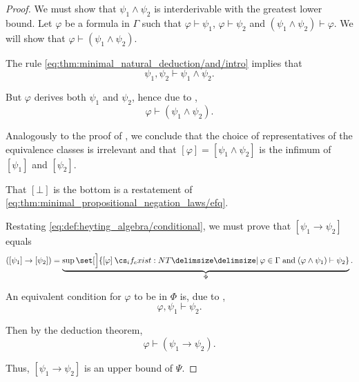 \begin{proof}
  We must show that \( \psi_1 \wedge \psi_2 \) is interderivable with the greatest lower bound. Let \( \varphi \) be a formula in \( \Gamma \) such that \( \varphi \vdash \psi_1 \), \( \varphi \vdash \psi_2 \) and \( (\psi_1 \wedge \psi_2) \vdash \varphi \). We will show that \( \varphi \vdash (\psi_1 \wedge \psi_2) \).

  The rule \eqref{eq:thm:minimal_natural_deduction/and/intro} implies that
  \begin{equation*}
    \psi_1, \psi_2 \vdash \psi_1 \wedge \psi_2.
  \end{equation*}

  But \( \varphi \) derives both \( \psi_1 \) and \( \psi_2 \), hence due to ,
  \begin{equation*}
    \varphi \vdash (\psi_1 \wedge \psi_2).
  \end{equation*}

  Analogously to the proof of , we conclude that the choice of representatives of the equivalence classes is irrelevant and that \( [\varphi] = [\psi_1 \wedge \psi_2] \) is the infimum of \( [\psi_1] \) and \( [\psi_2] \).

   That \( [\bot] \) is the bottom is a restatement of \eqref{eq:thm:minimal_propositional_negation_laws/efq}.

   Restating \eqref{eq:def:heyting_algebra/conditional}, we must prove that \( [\psi_1 \rightarrow \psi_2] \) equals
  \begin{equation*}
    ([\psi_1] \rightarrow [\psi_2]) = \underbrace{\sup\set[\Big]{ [\varphi] \given* \varphi \in \Gamma \T{and} (\varphi \wedge \psi_1) \vdash \psi_2 }}_{\Phi}.
  \end{equation*}

  An equivalent condition for \( \varphi \) to be in \( \Phi \) is, due to ,
  \begin{equation*}
    \varphi, \psi_1 \vdash \psi_2.
  \end{equation*}

  Then by the deduction theorem,
  \begin{equation*}
    \varphi \vdash (\psi_1 \rightarrow \psi_2).
  \end{equation*}

  Thus, \( [\psi_1 \rightarrow \psi_2] \) is an upper bound of \( \Psi \).


\end{proof}
